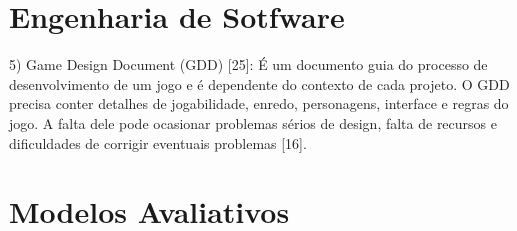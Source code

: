 \section{Engenharia de Sotfware}\label{sec:Engenharia}



5) Game Design Document (GDD) [25]: É um documento guia do processo de desenvolvimento de um jogo e é dependente do contexto de cada projeto. O GDD precisa conter detalhes de jogabilidade, enredo, personagens, interface e regras do jogo. A falta dele pode ocasionar problemas sérios de design, falta de recursos e dificuldades de corrigir eventuais problemas [16]. %







\section{Modelos Avaliativos}\label{sec:Engenharia}